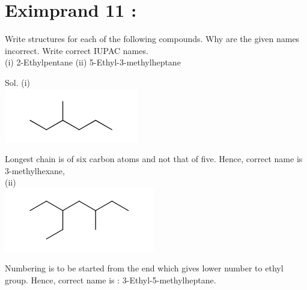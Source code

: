 \documentclass[10pt]{article}
\begin{document}
\section*{Eximprand 11 :}
Write structures for each of the following compounds. Why are the given names incorrect. Write correct IUPAC names.\\
(i) 2-Ethylpentane (ii) 5-Ethyl-3-methylheptane

Sol. (i)\\
\includegraphics{smile-fdea0f4575cd1d3e47c17f649ab6e9024039b109}

Longest chain is of six carbon atoms and not that of five. Hence, correct name is 3-methylhexane,\\
(ii)\\
\includegraphics{smile-0072e7b8037700345a042183fd14a945ab75f45b}

Numbering is to be started from the end which gives lower number to ethyl group. Hence, correct name is : 3-Ethyl-5-methylheptane.
\end{document}

